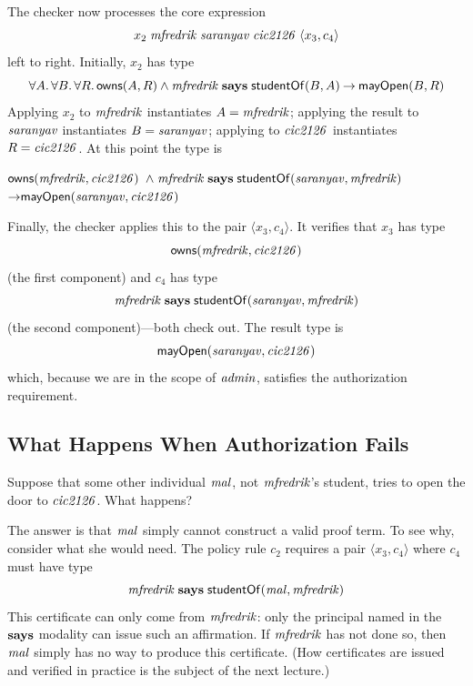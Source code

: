 \documentclass[11pt]{article}
\begin{document}
The checker now processes the core expression
\[
  x_2\; \mathit{mfredrik}\; \mathit{saranyav}\; \mathit{cic2126}\; \langle x_3, c_4\rangle
\]
left to right.  Initially, $x_2$ has type
\[
  \forall A.\, \forall B.\, \forall R.\, \mathsf{owns}(A, R) \land \mathit{mfredrik}
  \mathrel{\mathbf{says}} \mathsf{studentOf}(B, A) \mathbin{\rightarrow} \mathsf{mayOpen}(B, R)
\]
Applying $x_2$ to $\mathit{mfredrik}$ instantiates $A = \mathit{mfredrik}$; applying
the result to $\mathit{saranyav}$ instantiates $B = \mathit{saranyav}$; applying to
$\mathit{cic2126}$ instantiates $R = \mathit{cic2126}$.  At this point the type is
\begin{tabbing}
  \qquad $\mathsf{owns}(\mathit{mfredrik}, \mathit{cic2126})$
  $\land\; \mathit{mfredrik} \mathrel{\mathbf{says}} \mathsf{studentOf}(\mathit{saranyav}, \mathit{mfredrik})$ \\
  \qquad\qquad\qquad\quad $\mathbin{\rightarrow} \mathsf{mayOpen}(\mathit{saranyav}, \mathit{cic2126})$
\end{tabbing}
Finally, the checker applies this to the pair $\langle x_3, c_4 \rangle$.  It
verifies that $x_3$ has type
\[
  \mathsf{owns}(\mathit{mfredrik}, \mathit{cic2126})
\]
(the first component) and $c_4$ has type
\[
  \mathit{mfredrik} \mathrel{\mathbf{says}} \mathsf{studentOf}(\mathit{saranyav}, \mathit{mfredrik})
\]
(the second component)---both check out.  The result type is
\[
  \mathsf{mayOpen}(\mathit{saranyav}, \mathit{cic2126})
\]
which, because we are in the scope of $\mathit{admin}$, satisfies the authorization
requirement.

\subsection{What Happens When Authorization Fails}

Suppose that some other individual $\mathit{mal}$, not $\mathit{mfredrik}$'s student,
tries to open the door to $\mathit{cic2126}$.  What happens?

The answer is that $\mathit{mal}$ simply cannot construct a valid proof term.  To
see why, consider what she would need.  The policy rule $c_2$ requires a pair
$\langle x_3, c_4 \rangle$ where $c_4$ must have type
\[
  \mathit{mfredrik} \mathrel{\mathbf{says}} \mathsf{studentOf}(\mathit{mal}, \mathit{mfredrik})
\]
This certificate can only come from $\mathit{mfredrik}$: only the principal named
in the $\mathbf{says}$ modality can issue such an affirmation.  If $\mathit{mfredrik}$
has not done so, then $\mathit{mal}$ simply has no way to produce this certificate.
(How certificates are issued and verified in practice is the subject of the
next lecture.)
\end{document}

